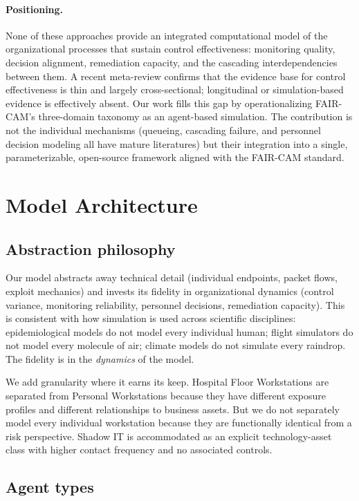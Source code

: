 \documentclass[11pt,a4paper]{article}
\begin{document}
\paragraph{Positioning.} None of these approaches provide an integrated computational model of the organizational processes that sustain control effectiveness: monitoring quality, decision alignment, remediation capacity, and the cascading interdependencies between them. A recent meta-review \citep{Woods2024} confirms that the evidence base for control effectiveness is thin and largely cross-sectional; longitudinal or simulation-based evidence is effectively absent. Our work fills this gap by operationalizing FAIR-CAM's three-domain taxonomy as an agent-based simulation. The contribution is not the individual mechanisms (queueing, cascading failure, and personnel decision modeling all have mature literatures) but their integration into a single, parameterizable, open-source framework aligned with the FAIR-CAM standard.


\section{Model Architecture}

\subsection{Abstraction philosophy}
\label{sec:abstraction}

Our model abstracts away technical detail (individual endpoints, packet flows, exploit mechanics) and invests its fidelity in organizational dynamics (control variance, monitoring reliability, personnel decisions, remediation capacity). This is consistent with how simulation is used across scientific disciplines: epidemiological models do not model every individual human; flight simulators do not model every molecule of air; climate models do not simulate every raindrop. The fidelity is in the \emph{dynamics} of the model.

We add granularity where it earns its keep. Hospital Floor Workstations are separated from Personal Workstations because they have different exposure profiles and different relationships to business assets. But we do not separately model every individual workstation because they are functionally identical from a risk perspective. Shadow IT is accommodated as an explicit technology-asset class with higher contact frequency and no associated controls.

\subsection{Agent types}
\end{document}
